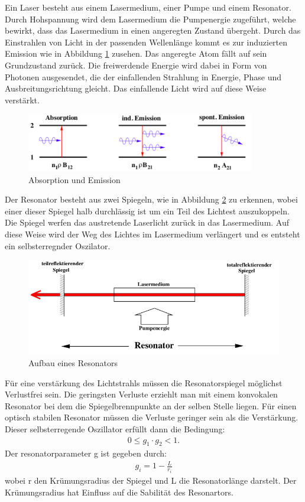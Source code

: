 Ein Laser besteht aus einem Lasermedium, einer Pumpe und einem Resonator.
Durch Hohspannung wird dem Lasermedium die Pumpenergie zugeführt, welche bewirkt, dass das Lasermedium in einen angeregten Zustand übergeht.
Durch das Einstrahlen von Licht in der passenden Wellenlänge kommt es zur induzierten Emission wie in Abbildung \ref{fig:absemi} zusehen.
Das angeregte Atom fällt auf sein Grundzustand zurück.
Die freiwerdende Energie wird dabei in Form von Photonen ausgesendet, die der einfallenden Strahlung in Energie, Phase und Ausbreitungsrichtung gleicht.
Das einfallende Licht wird auf diese Weise verstärkt.
\FloatBarrier
\begin{figure}
  \centering
  \includegraphics[width=10cm]{absorption.PNG}
  \caption{Absorption und Emission}
  \label{fig:absemi}
\end{figure}
\FloatBarrier
Der Resonator besteht aus zwei Spiegeln, wie in Abbildung \ref{fig:resonator} zu erkennen,  wobei einer dieser Spiegel halb durchlässig ist um ein Teil des Lichtest auszukoppeln.
Die Spiegel werfen das austretende Laserlicht zurück in das Lasermedium.
Auf diese Weise wird der Weg des Lichtes im Lasermedium verlängert und es entsteht ein selbsterregnder Oszilator.
\FloatBarrier
\begin{figure}
  \centering
  \includegraphics[width=15cm]{resonator.PNG}
  \caption{Aufbau eines Resonators}
  \label{fig:resonator}
\end{figure}
\FloatBarrier
Für eine verstärkung des Lichtstrahls müssen die Resonatorspiegel möglichst Verlustfrei sein.
Die geringsten Verluste erziehlt man mit einem konvokalen Resonator bei dem die Spiegelbrennpunkte an der selben Stelle liegen.
Für einen optisch stabilen Resonator müssen die Verluste geringer sein als die Verstärkung.
Dieser selbsterregende Oszillator erfüllt dann die Bedingung:
\begin{align*}
  0\leq g_1\cdot g_2 <1.
\end{align*}
Der resonatorparameter g ist gegeben durch:
\begin{align*}
  g_i=1-\frac{L}{r_i}
\end{align*}
wobei r den Krümungsradius der Spiegel und L die Resonatorlänge darstelt.
Der Krümungsradius hat Einfluss auf die Sabilität des Resonartors.

